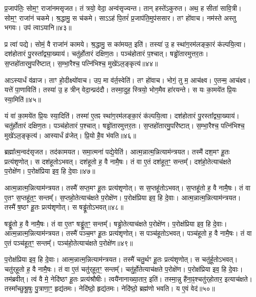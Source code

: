 प्र॒जा\-प॑तिः॒ सोम॒ꣳ॒ राजा॑नम\-सृजत।
तं त्रयो॒ वेदा॒ अन्व॑सृज्यन्त।
तान् हस्ते॑\-ऽकुरुत।
अथ॒ ह सीता॑ सावि॒त्री।
सोम॒ꣳ॒ राजा॑नं चकमे।
श्र॒द्धामु॒ स च॑कमे।
साऽऽह॑ पि॒तरं॑ प्र॒जा\-प॑ति॒मुप॑ससार।
तꣳ हो॑वाच।
नम॑स्ते अस्तु भगवः।
उप॑ त्वा\-ऽयानि॥४३॥

प्र त्वा॑ पद्ये।
सोमं॒ वै राजा॑नं कामये।
श्र॒द्धामु॒ स का॑मयत॒ इति॑।
तस्या॑ उ॒ ह स्था॑ग॒रम॑लङ्का॒रं क॑ल्पयि॒त्वा।
दश॑होतारं पु॒रस्ता᳚द्व्या॒ख्याय॑।
चतु॑र्\mbox{}होतारं दक्षिण॒तः।
पञ्च॑होतारं प॒श्चात्।
षड्ढो॑तारमुत्तर॒तः।
स॒प्तहो॑तारमु॒परि॑ष्टात्।
स॒म्भा॒रैश्च॒ पत्नि॑भिश्च॒ मुखे॑\-ऽल॒ङ्कृत्य॑॥४४॥

आऽस्यार्धं व॑व्राज।
ताꣳ हो॒दीक्ष्यो॑वाच।
उप॒ मा व॑र्त॒स्वेति॑।
तꣳ हो॑वाच।
भोगं॒ तु म॒ आच॑क्ष्व।
ए॒तन्म॒ आच॑क्ष्व।
यत्ते॑ पा॒णाविति॑।
तस्या॑ उ॒ ह त्रीन् वेदा॒न्प्रद॑दौ।
तस्मा॒दुह॒ स्त्रियो॒ भोग॒मैव हा॑रयन्ते।
स यः का॒मये॑त प्रि॒यः स्या॒मिति॑॥४५॥

यं वा॑ का॒मये॑त प्रि॒यः स्या॒दिति॑।
तस्मा॑ ए॒तꣴ स्था॑ग॒रम॑लङ्का॒रं क॑ल्पयि॒त्वा।
दश॑होतारं पु॒रस्ता᳚द्व्या॒ख्याय॑।
चतु॑र्\mbox{}होतारं दक्षिण॒तः।
पञ्च॑होतारं प॒श्चात्।
षड्ढो॑तारमुत्तर॒तः।
स॒प्तहो॑तारमु॒परि॑ष्टात्।
स॒म्भा॒रैश्च॒ पत्नि॑भिश्च॒ मुखे॑\-ऽल॒ङ्कृत्य॑।
आस्यार्धं व्र॑जेत्।
प्रि॒यो है॒व भ॑वति॥४६॥\anuvakamend[अ॒या॒न्य॒ल॒ङ्कृत्य॑ स्या॒मिति॑ भवति]

ब्रह्मा᳚त्म॒न्वद॑\-सृजत।
तद॑कामयत।
समा॒त्मना॑ पद्ये॒येति॑।
आत्म॒न्नात्म॒न्नित्याम॑न्त्रयत।
तस्मै॑ दश॒मꣳ हू॒तः प्रत्य॑शृणोत्।
स दश॑हूतो\-ऽभवत्।
दश॑हूतो ह॒ वै नामै॒षः।
तं वा ए॒तं दश॑हूत॒ꣳ॒ सन्तम्᳚।
दश॑हो॒तेत्याच॑क्षते प॒रोक्षे॑ण।
प॒रोक्ष॑प्रिया इव॒ हि दे॒वाः॥४७॥

आत्म॒न्नात्म॒न्नित्याम॑न्त्रयत।
तस्मै॑ सप्त॒मꣳ हू॒तः प्रत्य॑शृणोत्।
स स॒प्तहू॑तो\-ऽभवत्।
स॒प्तहू॑तो ह॒ वै नामै॒षः।
तं वा ए॒तꣳ स॒प्तहू॑त॒ꣳ॒ सन्तम्᳚।
स॒प्तहो॒तेत्याच॑क्षते प॒रोक्षे॑ण।
प॒रोक्ष॑प्रिया इव॒ हि दे॒वाः।
आत्म॒न्नात्म॒न्नित्याम॑न्त्रयत।
तस्मै॑ ष॒ष्ठꣳ हू॒तः प्रत्य॑शृणोत्।
स षड्ढू॑तो\-ऽभवत्॥४८॥

षड्ढू॑तो ह॒ वै नामै॒षः।
तं वा ए॒तꣳ षड्ढू॑त॒ꣳ॒ सन्तम्᳚।
षड्ढो॒तेत्याच॑क्षते प॒रोक्षे॑ण।
प॒रोक्ष॑प्रिया इव॒ हि दे॒वाः।
आत्म॒न्नात्म॒न्नित्याम॑न्त्रयत।
तस्मै॑ पञ्च॒मꣳ हू॒तः प्रत्य॑शृणोत्।
स पञ्च॑हूतो\-ऽभवत्।
पञ्च॑हूतो ह॒ वै नामै॒षः।
तं वा ए॒तं पञ्च॑हूत॒ꣳ॒ सन्तम्᳚।
पञ्च॑हो॒तेत्याच॑क्षते प॒रोक्षे॑ण॥४९॥

प॒रोक्ष॑प्रिया इव॒ हि दे॒वाः।
आत्म॒न्नात्म॒न्नित्याम॑न्त्रयत।
तस्मै॑ चतु॒र्थꣳ हू॒तः प्रत्य॑शृणोत्।
स चतु॑र्\mbox{}हूतो\-ऽभवत्।
चतु॑र्‌\mbox{}हूतो ह॒ वै नामै॒षः।
तं वा ए॒तं चतु॑र्‌\mbox{}हूत॒ꣳ॒ सन्तम्᳚।
चतु॑र्हो॒तेत्याच॑क्षते प॒रोक्षे॑ण।
प॒रोक्ष॑प्रिया इव॒ हि दे॒वाः।
तम॑ब्रवीत्।
त्वं वै मे॒ नेदि॑ष्ठꣳ हू॒तः प्रत्य॑श्रौषीः।
त्वयै॑नानाख्या॒तार॒ इति॑।
तस्मा॒न्नु है॑ना॒ꣴ॒श्चतु॑र्‌\mbox{}होतार॒ इत्याच॑क्षते।
तस्मा᳚च्छुश्रू॒षुः पु॒त्राणा॒ꣳ॒ हृद्य॑तमः।
नेदि॑ष्ठो॒ हृद्य॑तमः।
नेदि॑ष्ठो॒ ब्रह्म॑णो भवति।
य ए॒वं वेद॑॥५०॥\anuvakamend[दे॒वाः षड्ढू॑तो\-ऽभव॒त्पञ्च॑हो॒तेत्याच॑क्षते प॒रोक्षे॑णाश्रौषीः॒ षट्च॑]




